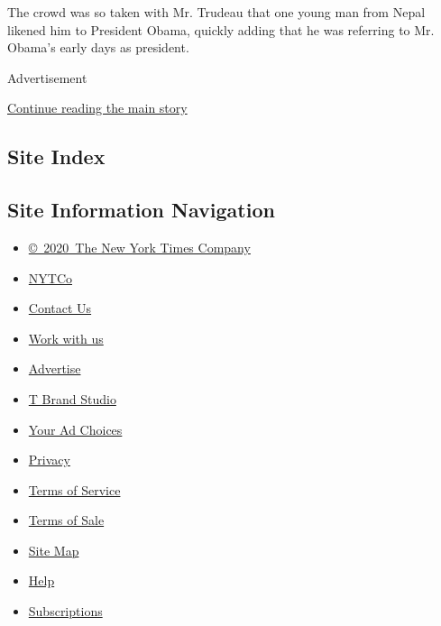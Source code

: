 The crowd was so taken with Mr. Trudeau that one young man from Nepal
likened him to President Obama, quickly adding that he was referring to
Mr. Obama's early days as president.

Advertisement

\protect\hyperlink{after-bottom}{Continue reading the main story}

\hypertarget{site-index}{%
\subsection{Site Index}\label{site-index}}

\hypertarget{site-information-navigation}{%
\subsection{Site Information
Navigation}\label{site-information-navigation}}

\begin{itemize}
\tightlist
\item
  \href{https://help.nytimes.com/hc/en-us/articles/115014792127-Copyright-notice}{©~2020~The
  New York Times Company}
\end{itemize}

\begin{itemize}
\tightlist
\item
  \href{https://www.nytco.com/}{NYTCo}
\item
  \href{https://help.nytimes.com/hc/en-us/articles/115015385887-Contact-Us}{Contact
  Us}
\item
  \href{https://www.nytco.com/careers/}{Work with us}
\item
  \href{https://nytmediakit.com/}{Advertise}
\item
  \href{http://www.tbrandstudio.com/}{T Brand Studio}
\item
  \href{https://www.nytimes.com/privacy/cookie-policy\#how-do-i-manage-trackers}{Your
  Ad Choices}
\item
  \href{https://www.nytimes.com/privacy}{Privacy}
\item
  \href{https://help.nytimes.com/hc/en-us/articles/115014893428-Terms-of-service}{Terms
  of Service}
\item
  \href{https://help.nytimes.com/hc/en-us/articles/115014893968-Terms-of-sale}{Terms
  of Sale}
\item
  \href{https://spiderbites.nytimes.com}{Site Map}
\item
  \href{https://help.nytimes.com/hc/en-us}{Help}
\item
  \href{https://www.nytimes.com/subscription?campaignId=37WXW}{Subscriptions}
\end{itemize}
